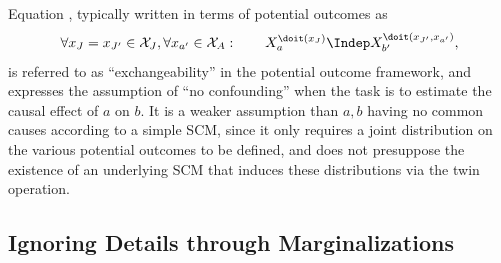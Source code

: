Equation , typically written in terms of potential outcomes as
  $$\forall x_J = x_{J'} \in \CX_J, \forall x_{a'} \in \CX_A : \qquad X_a^{\doit(x_J)} \Indep X_{b'}^{\doit(x_{J'},x_{a'})},$$
is referred to as ``exchangeability'' in the potential outcome framework, and 
expresses the assumption of ``no confounding'' when the task is to estimate the causal effect of $a$ on $b$. 
It is a weaker assumption than $a,b$ having no common causes according to a simple SCM,
since it only requires a joint distribution on the various potential outcomes to be defined, and does not
presuppose the existence of an underlying SCM that induces these distributions via the twin operation.
  

\subsection{Ignoring Details through Marginalizations}

